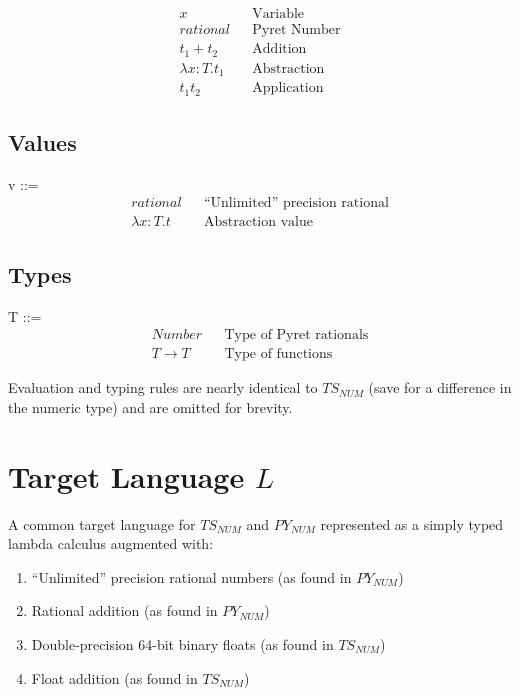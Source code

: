 \documentclass{article}
\begin{document}
	\begin{align*}
	x											&& \text{Variable}\\
	rational  									&& \text{Pyret Number} \\
	t_1 + t_2 									&& \text{Addition} \\
	\lambda x \colon T.t_1						&& \text{Abstraction} \\
	t_1 t_2										&& \text{Application}
	\end{align*}
	
	
	\subsection{Values}
	v ::=
	\begin{align*}
		rational							&& \text{``Unlimited'' precision rational} \\
		\lambda x \colon T.t						&& \text{Abstraction value}
	\end{align*}
	
	
	\subsection{Types}
	T ::=
	\begin{align*}
		Number												&& \text{Type of Pyret rationals}\\
		T \rightarrow T										&& \text{Type of functions}
	\end{align*}
		
	Evaluation and typing rules are nearly identical to $TS_{NUM}$ (save for a difference in the numeric type) and are omitted for brevity.


	\section{Target Language $L$}
	A common target language for $TS_{NUM}$ and $PY_{NUM}$ represented as a simply typed lambda calculus augmented with:
	\begin{enumerate}
		\item ``Unlimited'' precision rational numbers (as found in $PY_{NUM}$)
		\item Rational addition (as found in $PY_{NUM}$)
		\item Double-precision 64-bit binary floats (as found in $TS_{NUM}$)
		\item Float addition (as found in $TS_{NUM}$)
	\end{enumerate}
\end{document}
